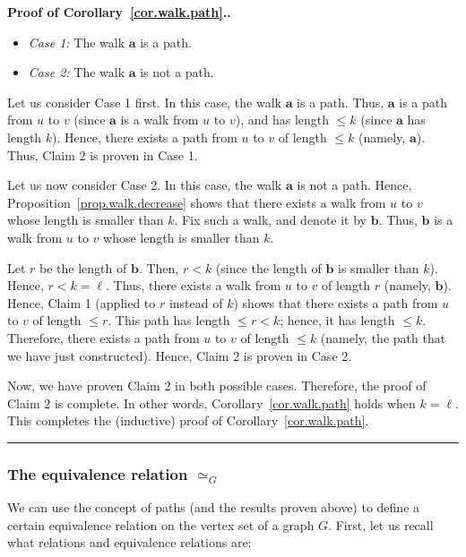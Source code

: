 \documentclass[numbers=enddot,12pt,final,onecolumn,notitlepage]{scrartcl}%
\theoremstyle{definition}
\newenvironment{proof}[1][Proof]{\noindent\textbf{#1.} }{\ \rule{0.5em}{0.5em}}
\begin{document}
\begin{proof}[Proof of Corollary~\ref{cor.walk.path}.]
\begin{itemize}
\item \textit{Case 1:} The walk $\mathbf{a}$ is a path.
\item \textit{Case 2:} The walk $\mathbf{a}$ is not a path.
\end{itemize}

Let us consider Case 1 first. In this case, the walk $\mathbf{a}$ is a
path. Thus, $\mathbf{a}$ is a path from $u$ to $v$ (since $\mathbf{a}$
is a walk from $u$ to $v$), and has length $\leq k$ (since
$\mathbf{a}$ has length $k$). Hence, there exists a path from $u$ to
$v$ of length $\leq k$ (namely, $\mathbf{a}$). Thus, Claim 2 is proven
in Case 1.

Let us now consider Case 2. In this case, the walk $\mathbf{a}$ is not
a path. Hence, Proposition~\ref{prop.walk.decrease} shows that there
exists a walk from $u$ to $v$ whose length is smaller than $k$.
Fix such a walk, and denote it by $\mathbf{b}$. Thus, $\mathbf{b}$ is
a walk from $u$ to $v$ whose length is smaller than $k$.

Let $r$ be the length of $\mathbf{b}$. Then, $r < k$ (since the length
of $\mathbf{b}$ is smaller than $k$). Hence, $r < k = \ell$. Thus,
there exists a walk from $u$ to $v$ of length $r$ (namely,
$\mathbf{b}$). Hence, Claim 1 (applied to $r$ instead of $k$) shows
that there exists a path from $u$ to $v$ of length $\leq r$.
This path has length $\leq r < k$; hence, it has length $\leq k$.
Therefore, there exists a path from $u$ to $v$ of length $\leq k$
(namely, the path that we have just constructed). Hence, Claim 2 is
proven in Case 2.

Now, we have proven Claim 2 in both possible cases. Therefore, the
proof of Claim 2 is complete. In other words,
Corollary~\ref{cor.walk.path} holds when $k = \ell$. This completes
the (inductive) proof of Corollary~\ref{cor.walk.path}.
\end{proof}

\subsubsection{The equivalence relation $\simeq_G$}

We can use the concept of paths (and the results proven above) to
define a certain equivalence relation on the vertex set of a graph
$G$. First, let us recall what relations and equivalence relations
are:
\end{document}
